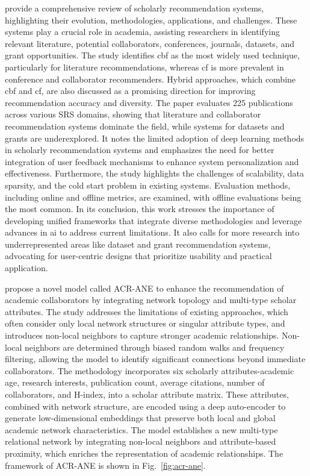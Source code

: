 \textcite{Zhang2023} provide a comprehensive review of scholarly recommendation systems, highlighting their evolution, methodologies, applications, and challenges.
These systems play a crucial role in academia, assisting researchers in identifying relevant literature, potential collaborators, conferences, journals, datasets, and grant opportunities.
The study identifies \gls{cbf} as the most widely used technique, particularly for literature recommendations, whereas \gls{cf} is more prevalent in conference and collaborator recommenders.
Hybrid approaches, which combine \gls{cbf} and \gls{cf}, are also discussed as a promising direction for improving recommendation accuracy and diversity.
The paper evaluates 225 publications across various SRS domains, showing that literature and collaborator recommendation systems dominate the field, while systems for datasets and grants are underexplored.
It notes the limited adoption of deep learning methods in scholarly recommendation systems and emphasizes the need for better integration of user feedback mechanisms to enhance system personalization and effectiveness.
Furthermore, the study highlights the challenges of scalability, data sparsity, and the cold start problem in existing systems.
Evaluation methods, including online and offline metrics, are examined, with offline evaluations being the most common.
In its conclusion, this work stresses the importance of developing unified frameworks that integrate diverse methodologies and leverage advances in \gls{ai} to address current limitations.
It also calls for more research into underrepresented areas like dataset and grant recommendation systems, advocating for user-centric designs that prioritize usability and practical application.

\textcite{Du2022} propose a novel model called ACR-ANE to enhance the recommendation of academic collaborators by integrating network topology and multi-type scholar attributes.
The study addresses the limitations of existing approaches, which often consider only local network structures or singular attribute types, and introduces non-local neighbors to capture stronger academic relationships.
Non-local neighbors are determined through biased random walks and frequency filtering, allowing the model to identify significant connections beyond immediate collaborators.
The methodology incorporates six scholarly attributes-academic age, research interests, publication count, average citations, number of collaborators, and H-index, into a scholar attribute matrix.
These attributes, combined with network structure, are encoded using a deep auto-encoder to generate low-dimensional embeddings that preserve both local and global academic network characteristics.
The model establishes a new multi-type relational network by integrating non-local neighbors and attribute-based proximity, which enriches the representation of academic relationships.
The framework of ACR-ANE is shown in Fig.~\ref{fig:acr-ane}.

